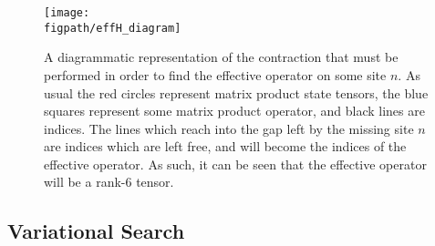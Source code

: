 \begin{figure}[ht!]
\centering
\texttt{[image: \\figpath/effH\_diagram]}
\caption{A diagrammatic representation of the contraction that must be performed in order to find the effective operator on some site \(n\). As usual the red circles represent matrix product state tensors, the blue squares represent some matrix product operator, and black lines are indices. The lines which reach into the gap left by the missing site \(n\) are indices which are left free, and will become the indices of the effective operator. As such, it can be seen that the effective operator will be a rank-6 tensor.}
\label{fig:vs1-3}
\end{figure}

\subsection{Variational Search}

